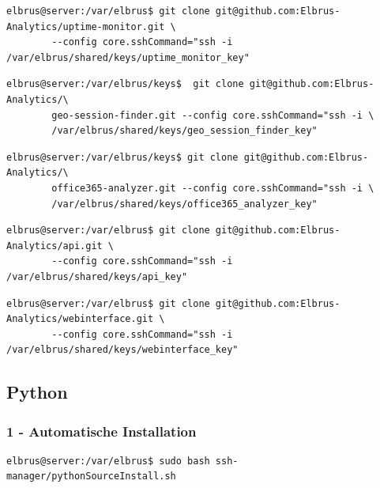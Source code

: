 \documentclass{article}
\begin{document}
	\lstset{style=commands}
	\begin{lstlisting}[caption={Clonen der 'Uptime-Monitor' Software.}]
		elbrus@server:/var/elbrus$ git clone git@github.com:Elbrus-Analytics/uptime-monitor.git \
		--config core.sshCommand="ssh -i /var/elbrus/shared/keys/uptime_monitor_key"
	\end{lstlisting}

	\lstset{style=commands}
	\begin{lstlisting}[caption={Clonen der 'geo session finders' Software.}]
		elbrus@server:/var/elbrus/keys$  git clone git@github.com:Elbrus-Analytics/\
		geo-session-finder.git --config core.sshCommand="ssh -i \
		/var/elbrus/shared/keys/geo_session_finder_key"
	\end{lstlisting}

	\lstset{style=commands}
	\begin{lstlisting}[caption={Clonen der 'office365-analyzer' Software.}]
		elbrus@server:/var/elbrus/keys$ git clone git@github.com:Elbrus-Analytics/\
		office365-analyzer.git --config core.sshCommand="ssh -i \
		/var/elbrus/shared/keys/office365_analyzer_key"
	\end{lstlisting}
	
	\lstset{style=commands}
	\begin{lstlisting}[caption={Clonen der 'API' Software.}]
		elbrus@server:/var/elbrus$ git clone git@github.com:Elbrus-Analytics/api.git \
		--config core.sshCommand="ssh -i /var/elbrus/shared/keys/api_key"
	\end{lstlisting}

	\lstset{style=commands}
	\begin{lstlisting}[caption={Clonen der 'Webinterface' Software}]
		elbrus@server:/var/elbrus$ git clone git@github.com:Elbrus-Analytics/webinterface.git \
		--config core.sshCommand="ssh -i /var/elbrus/shared/keys/webinterface_key"
	\end{lstlisting}
	\newpage
	
	\subsection{Python}
	\subsubsection{1 - Automatische Installation}

	\lstset{style=commands}
	\begin{lstlisting}[caption={Ausführen des 'pythonSourceInstall.sh' Scripts.}]
		elbrus@server:/var/elbrus$ sudo bash ssh-manager/pythonSourceInstall.sh
	\end{lstlisting}
	
\end{document}
